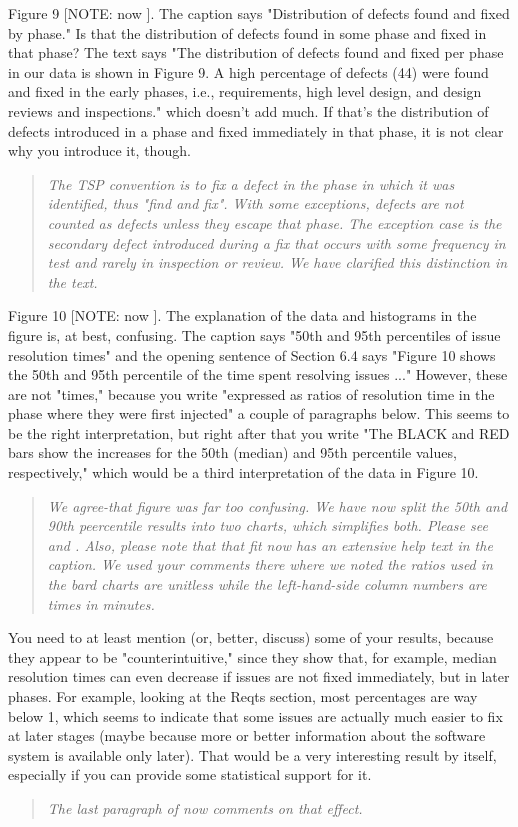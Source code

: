 Figure 9 [NOTE: now ]. The caption says "Distribution of defects found
and fixed by phase." Is that the distribution of defects
found in some phase and fixed in that phase? The text says
"The distribution of defects found and fixed per phase in
our data is shown in Figure 9. A high percentage of defects
(44) were found and fixed in the early phases, i.e.,
requirements, high level design, and design reviews and
inspections." which doesn't add much. If that's the
distribution of defects introduced in a phase and fixed
immediately in that phase, it is not clear why you introduce
it, though.
\begin{quote}
{\em 
The TSP convention is to fix a defect in the phase in which it was identified, thus "find and fix". With some exceptions, defects are not counted as defects unless they escape that phase. The exception case is the secondary defect introduced during a fix that occurs with some frequency in test and rarely in inspection or review. We have clarified this distinction in the text.}
\end{quote}
Figure 10 [NOTE: now ]. The explanation of the data and histograms in the
figure is, at best, confusing. The caption says "50th and
95th percentiles of issue resolution times" and the opening
sentence of Section 6.4 says "Figure 10 shows the 50th and
95th percentile of the time spent resolving issues ..."
However, these are not "times," because you write "expressed
as ratios of resolution time in the phase where they were
first injected" a couple of paragraphs below. This seems to
be the right interpretation, but right after that you write
"The BLACK and RED bars show the increases for the 50th
(median) and 95th percentile values, respectively," which
would be a third interpretation of the data in Figure 10.
\begin{quote}
{\em We agree-that figure was far too confusing. We have now split the 50th and 90th peercentile results
into two charts, which simplifies both. Please see  and .
Also, please note that that fit now has an extensive help text in the caption.
We used your comments there where we noted the ratios used in the
bard charts are unitless while the left-hand-side column numbers are
times in minutes.
}
\end{quote}
 
You need to at least mention (or, better, discuss) some of
your results, because they appear to be "counterintuitive,"
since they show that, for example, median resolution times
can even decrease if issues are not fixed immediately, but
in later phases. For example, looking at the Reqts section,
most percentages are way below 1, which seems to indicate
that some issues are actually much easier to fix at later
stages (maybe because more or better information about the
software system is available only later). That would be a
very interesting result by itself, especially if you can
provide some statistical support for it.
\begin{quote}{\em
The last paragraph of  now comments
on that effect. }
\end{quote}
 

